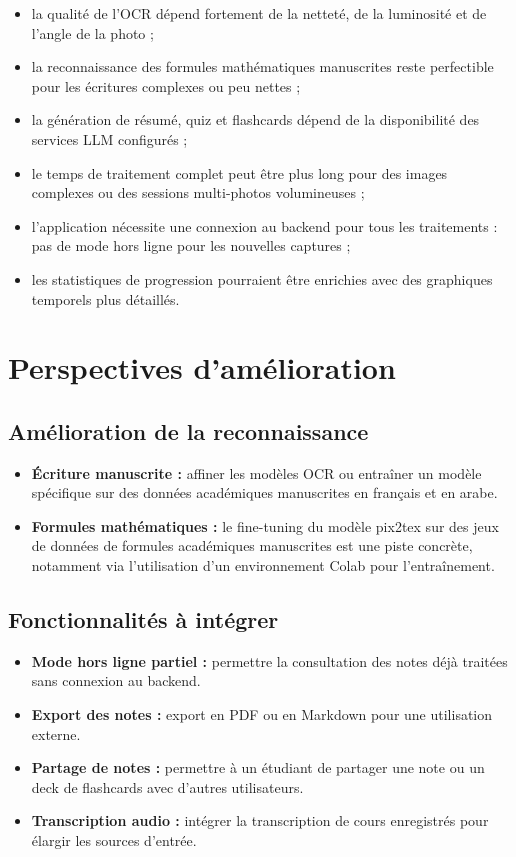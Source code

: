 \documentclass[12pt,a4paper]{report}
\begin{document}
\begin{itemize}[label=--]
    \item la qualité de l'OCR dépend fortement de la netteté, de la luminosité et de l'angle de la photo ;
    \item la reconnaissance des formules mathématiques manuscrites reste perfectible pour les écritures complexes ou peu nettes ;
    \item la génération de résumé, quiz et flashcards dépend de la disponibilité des services LLM configurés ;
    \item le temps de traitement complet peut être plus long pour des images complexes ou des sessions multi-photos volumineuses ;
    \item l'application nécessite une connexion au backend pour tous les traitements : pas de mode hors ligne pour les nouvelles captures ;
    \item les statistiques de progression pourraient être enrichies avec des graphiques temporels plus détaillés.
\end{itemize}

\section{Perspectives d'amélioration}

\subsection{Amélioration de la reconnaissance}

\begin{itemize}[label=--]
    \item \textbf{Écriture manuscrite :} affiner les modèles OCR ou entraîner un modèle spécifique sur des données académiques manuscrites en français et en arabe.
    \item \textbf{Formules mathématiques :} le fine-tuning du modèle pix2tex sur des jeux de données de formules académiques manuscrites est une piste concrète, notamment via l'utilisation d'un environnement Colab pour l'entraînement.
\end{itemize}

\subsection{Fonctionnalités à intégrer}

\begin{itemize}[label=--]
    \item \textbf{Mode hors ligne partiel :} permettre la consultation des notes déjà traitées sans connexion au backend.
    \item \textbf{Export des notes :} export en PDF ou en Markdown pour une utilisation externe.
    \item \textbf{Partage de notes :} permettre à un étudiant de partager une note ou un deck de flashcards avec d'autres utilisateurs.
    \item \textbf{Transcription audio :} intégrer la transcription de cours enregistrés pour élargir les sources d'entrée.
\end{itemize}
\end{document}
